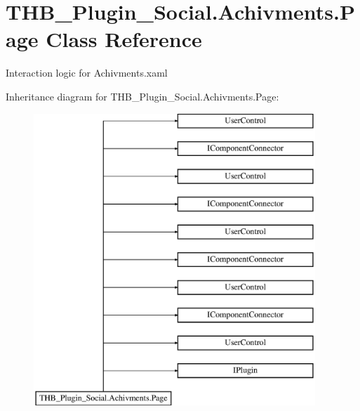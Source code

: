 \hypertarget{class_t_h_b___plugin___social_1_1_achivments_1_1_page}{}\section{T\+H\+B\+\_\+\+Plugin\+\_\+\+Social.\+Achivments.\+Page Class Reference}
\label{class_t_h_b___plugin___social_1_1_achivments_1_1_page}


Interaction logic for Achivments.\+xaml  


Inheritance diagram for T\+H\+B\+\_\+\+Plugin\+\_\+\+Social.\+Achivments.\+Page\+:\begin{figure}[H]
\begin{center}
\leavevmode
\includegraphics[height=11.000000cm]{d1/dc9/class_t_h_b___plugin___social_1_1_achivments_1_1_page}
\end{center}
\end{figure}
